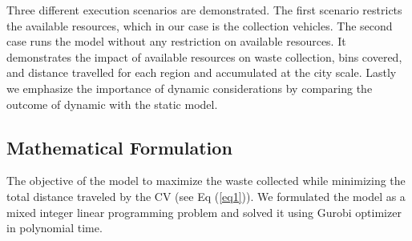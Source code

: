 \documentclass[12pt]{article}
\begin{document}

Three different execution scenarios are demonstrated. The first scenario restricts the available resources, which in our case is the collection vehicles. The second case runs the model without any restriction on available resources. It demonstrates the impact of available resources on waste collection, bins covered, and distance travelled for each region and accumulated at the city scale. Lastly we emphasize the importance of dynamic considerations by comparing the outcome of dynamic with the static model.

\subsection {Mathematical Formulation}

The objective of the model to maximize the waste collected while minimizing the total distance traveled by the CV (see Eq (\ref{eq1})). We formulated the model as a mixed integer linear programming problem and solved it using Gurobi optimizer \parencite{gurobi} in polynomial time.
\end{document}
